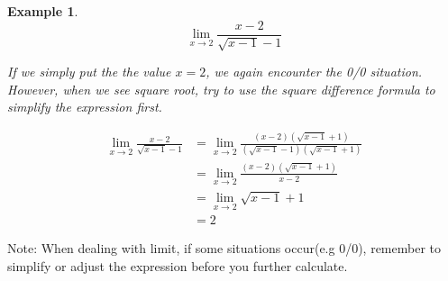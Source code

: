\documentclass{article}
\newtheorem{ex}{Example}
\begin{document}
\begin{ex}
	\[\lim_{x\to2}\frac{x-2}{\sqrt{x-1} -1}\]
	
	If we simply put the the value $x=2$, we again encounter the 0/0 situation.
	However, when we see square root, try to use the square difference formula to simplify the expression first.
	
	\begin{align*}
	\lim_{x\to2}\frac{x-2}{\sqrt{x-1} -1} 
	&= \lim_{x\to2}\frac{(x-2)(\sqrt{x-1}+1)}{(\sqrt{x-1} -1)(\sqrt{x-1}+1)}\\
	&= \lim_{x\to2} \frac{(x-2)(\sqrt{x-1}+1)}{x-2}\\
	&= \lim_{x\to2} \sqrt{x-1}+1\\
	&= 2 
	\end{align*} 
\end{ex}


Note: When dealing with limit, if some situations occur(e.g 0/0), remember to simplify or adjust the expression before you further calculate.
\end{document}

